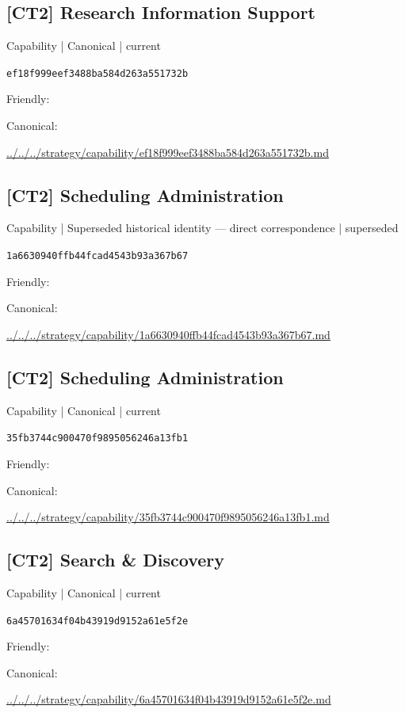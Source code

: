 \documentclass[10pt,a4paper]{article}
\begin{document}
\subsection*{[CT2] Research Information Support}
{\small Capability | Canonical | current}\par
\texttt{ef18f999eef3488ba584d263a551732b}\par
Friendly: \par
Canonical: \par
{\footnotesize\url{../../../strategy/capability/ef18f999eef3488ba584d263a551732b.md}}\par
\subsection*{[CT2] Scheduling Administration}
{\small Capability | Superseded historical identity — direct correspondence | superseded}\par
\texttt{1a6630940ffb44fcad4543b93a367b67}\par
Friendly: \par
Canonical: \par
{\footnotesize\url{../../../strategy/capability/1a6630940ffb44fcad4543b93a367b67.md}}\par
\subsection*{[CT2] Scheduling Administration}
{\small Capability | Canonical | current}\par
\texttt{35fb3744c900470f9895056246a13fb1}\par
Friendly: \par
Canonical: \par
{\footnotesize\url{../../../strategy/capability/35fb3744c900470f9895056246a13fb1.md}}\par
\subsection*{[CT2] Search \& Discovery}
{\small Capability | Canonical | current}\par
\texttt{6a45701634f04b43919d9152a61e5f2e}\par
Friendly: \par
Canonical: \par
{\footnotesize\url{../../../strategy/capability/6a45701634f04b43919d9152a61e5f2e.md}}\par
\end{document}
